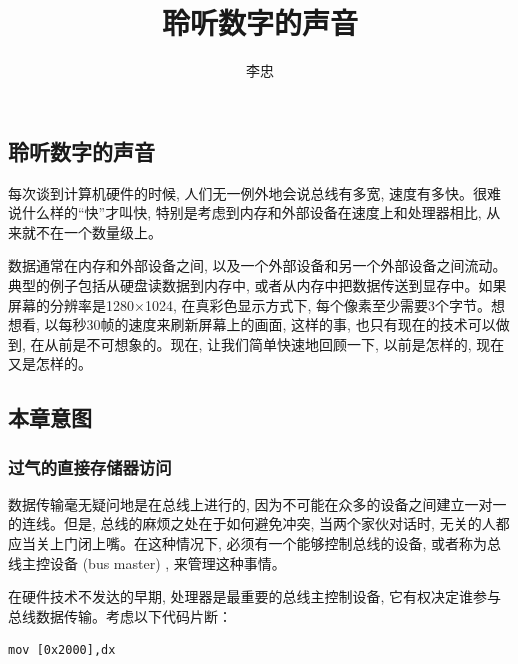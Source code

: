\documentclass[12pt]{article}
\begin{document}
\begin{CJK}{UTF8}{gbsn} %


\title{聆听数字的声音}
\author{李忠}

\maketitle

\newpage
\tableofcontents
\newpage

\addtocounter{section}{9}
\addtocounter{table}{9}
\addtocounter{figure}{9}
\section{聆听数字的声音}
每次谈到计算机硬件的时候, 人们无一例外地会说总线有多宽, 速度有多快。很难说什么样的“快”才叫快, 特别是考虑到内存和外部设备在速度上和处理器相比, 从来就不在一个数量级上。

数据通常在内存和外部设备之间, 以及一个外部设备和另一个外部设备之间流动。典型的例子包括从硬盘读数据到内存中, 或者从内存中把数据传送到显存中。如果屏幕的分辨率是1280×1024, 在真彩色显示方式下, 每个像素至少需要3个字节。想想看, 以每秒30帧的速度来刷新屏幕上的画面, 这样的事, 也只有现在的技术可以做到, 在从前是不可想象的。现在, 让我们简单快速地回顾一下, 以前是怎样的, 现在又是怎样的。

\subsection{本章意图}
\subsubsection{过气的直接存储器访问}
数据传输毫无疑问地是在总线上进行的, 因为不可能在众多的设备之间建立一对一的连线。但是, 总线的麻烦之处在于如何避免冲突, 当两个家伙对话时, 无关的人都应当关上门闭上嘴。在这种情况下, 必须有一个能够控制总线的设备, 或者称为总线主控设备 (bus master) , 来管理这种事情。

在硬件技术不发达的早期, 处理器是最重要的总线主控制设备, 它有权决定谁参与总线数据传输。考虑以下代码片断：

\begin{verbatim}
mov [0x2000],dx
\end{verbatim}


\end{CJK}
\end{document}
